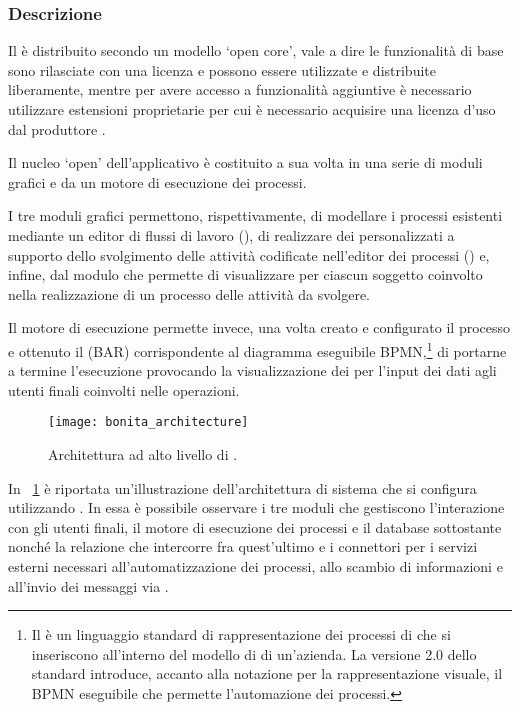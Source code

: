 \subsubsection{Descrizione}
Il \sw è distribuito secondo un modello `open core', vale a dire le funzionalità di base sono rilasciate con una licenza  e possono essere utilizzate e distribuite liberamente, mentre per avere accesso a funzionalità aggiuntive è necessario utilizzare estensioni proprietarie per cui è necessario acquisire una licenza d'uso dal produttore \progname.

Il nucleo `open' dell'applicativo è costituito a sua volta in una serie di moduli grafici e da un motore di esecuzione dei processi.

I tre moduli grafici permettono, rispettivamente, di modellare i processi esistenti mediante un editor di flussi di lavoro (), di realizzare dei  personalizzati a supporto dello svolgimento delle attività codificate nell'editor dei processi () e, infine, dal modulo  che permette di visualizzare per ciascun soggetto coinvolto nella realizzazione di un processo delle attività da svolgere.

Il motore di esecuzione permette invece, una volta creato e configurato il processo e ottenuto il  (BAR) corrispondente al diagramma eseguibile BPMN,\footnote{%
Il  è un linguaggio standard di rappresentazione dei processi di \bsn che si inseriscono all'interno del modello di \bsn di un'azienda. La versione 2.0 dello standard introduce, accanto alla notazione per la rappresentazione visuale, il BPMN eseguibile che permette l'automazione dei processi.
}
di portarne a termine l'esecuzione provocando la visualizzazione dei  per l'input dei dati agli utenti finali coinvolti nelle operazioni.

\begin{figure}[H]
  \centering
  \texttt{[image: bonita\_architecture]}
  \caption{Architettura ad alto livello di \progname.}
  \label{fig:bonitaarchitecture}
\end{figure}

In \figurename~\ref{fig:bonitaarchitecture} è riportata un'illustrazione dell'architettura di sistema che si configura utilizzando \progname. In essa è possibile osservare i tre moduli che gestiscono l'interazione con gli utenti finali, il motore di esecuzione dei processi e il database sottostante nonché la relazione che intercorre fra quest'ultimo e i connettori per i servizi esterni necessari all'automatizzazione dei processi, allo scambio di informazioni e all'invio dei messaggi via .

